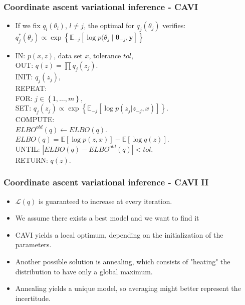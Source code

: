 \documentclass{beamer}
\begin{document}
\begin{frame}
\frametitle{Coordinate ascent variational inference - CAVI}
\begin{itemize}
\item If we fix $q_l(\theta_l)$, $l \neq j$, the optimal for $q_j(\theta_j)$ verifies: $q^*_j(\theta_j) \propto \exp\left\lbrace\mathbb{E}_{-j}\left[\log p(\theta_j \mid \boldsymbol{\theta}_{-j},\boldsymbol{y}\right]\right\rbrace$
\item \begin{text}
IN: $p(x,z)$, data set $x$, tolerance $tol$,\\
OUT: $q(z) = \prod q_j(z_j)$.\\
INIT: $q_j(z_j)$, \\
REPEAT:\\
\quad FOR: $j \in \left\lbrace1, \dots, m\right\rbrace$,\\
\quad \quad SET: $q_j(z_j) \propto \exp\left\lbrace\mathbb{E}_{-j}\left[\log p(z_j|z_{-j},x)\right]\right\rbrace$.\\
\quad COMPUTE:\\
\quad \quad $ELBO^{old}(q) \leftarrow ELBO(q)$.\\
\quad \quad $ELBO(q) = \mathbb{E}\left[\log p(z,x)\right] - \mathbb{E}\left[\log q(z) \right] $.\\
UNTIL: $|ELBO(q)-ELBO^{old}(q)|<tol$.\\
RETURN: $q(z).$
\end{text}
\end{itemize}
\end{frame}

\begin{frame}
\frametitle{Coordinate ascent variational inference - CAVI II}
\begin{itemize}
\item $\mathcal{L}(q)$ is guaranteed to increase at every iteration.
\item We assume there exists a best model and we want to find it
\item CAVI yields a local optimum, depending on the initialization of the parameters.
\item Another possible solution is annealing, which consists of "heating" the distribution to have only a global maximum.
\item Annealing yields a unique model, so averaging might better represent the incertitude.
\end{itemize}
\end{frame}
\end{document}
